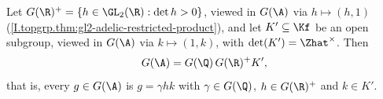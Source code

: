 Let $G(\R)^+=\{h\in\GL_2(\R):\det h>0\}$, viewed in $G(\A)$ via $h\mapsto(h,1)$ (\cref{I.topgrp.thm:gl2-adelic-restricted-product}),
and let $K'\subseteq\Kf$ be an open subgroup, viewed in $G(\A)$ via $k\mapsto(1,k)$, with $\det(K')=\Zhat^\times$. Then
\[
  G(\A)=G(\Q)\,G(\R)^+K',
\]
that is, every $g\in G(\A)$ is $g=\gamma hk$ with $\gamma\in G(\Q)$, $h\in G(\R)^+$ and $k\in K'$.
